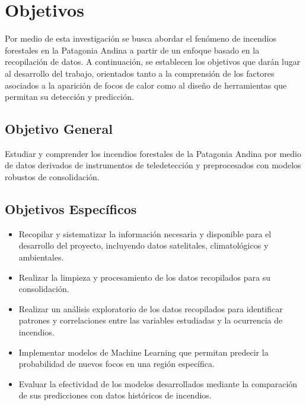 \section{Objetivos}
Por medio de esta investigación se busca abordar el fenómeno de incendios forestales en la Patagonia Andina a partir de un enfoque basado en la recopilación de datos. A continuación, se establecen los objetivos que darán lugar al desarrollo del trabajo, orientados tanto a la comprensión de los factores asociados a la aparición de focos de calor como al diseño de herramientas que permitan su detección y predicción.

\subsection{Objetivo General}
Estudiar y comprender los incendios forestales de la Patagonia Andina por medio de datos derivados de instrumentos de teledetección y preprocesados con modelos robustos de consolidación.

\subsection{Objetivos Específicos}
\begin{itemize}
    \item Recopilar y sistematizar la información necesaria y disponible para el desarrollo del proyecto, incluyendo datos satelitales, climatológicos y ambientales.
    \item Realizar la limpieza y procesamiento de los datos recopilados para su consolidación.
    \item Realizar un análisis exploratorio de los datos recopilados para identificar patrones y correlaciones entre las variables estudiadas y la ocurrencia de incendios.
    \item Implementar modelos de Machine Learning que permitan predecir la probabilidad de nuevos focos en una región específica.
    \item Evaluar la efectividad de los modelos desarrollados mediante la comparación de sus predicciones con datos históricos de incendios.
\end{itemize}